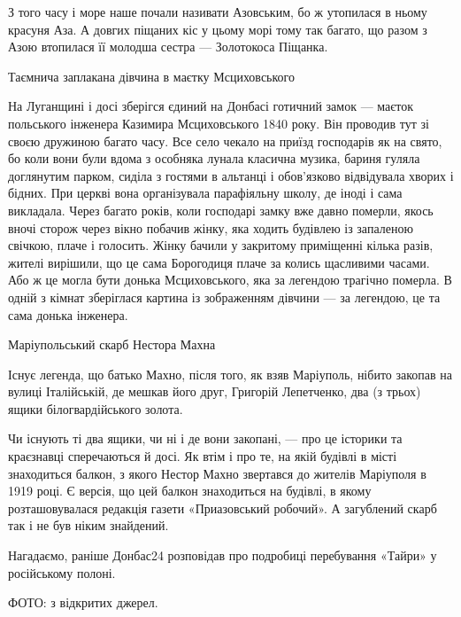 З того часу і море наше почали називати Азовським, бо ж утопилася в ньому
красуня Аза. А довгих піщаних кіс у цьому морі тому так багато, що разом з Азою
втопилася її молодша сестра — Золотокоса Піщанка.

Таємнича заплакана дівчина в маєтку Мсциховського

На Луганщині і досі зберігся єдиний на Донбасі готичний замок — маєток
польського інженера Казимира Мсциховського 1840 року. Він проводив тут зі своєю
дружиною багато часу. Все село чекало на приїзд господарів як на свято, бо коли
вони були вдома з особняка лунала класична музика, бариня гуляла доглянутим
парком, сиділа з гостями в альтанці і обов'язково відвідувала хворих і бідних.
При церкві вона організувала парафіяльну школу, де іноді і сама викладала.
Через багато років, коли господарі замку вже давно померли, якось вночі сторож
через вікно побачив жінку, яка ходить будівлею із запаленою свічкою, плаче і
голосить. Жінку бачили у закритому приміщенні кілька разів, жителі вирішили, що
це сама Борогодиця плаче за колись щасливими часами. Або ж це могла бути донька
Мсциховського, яка за легендою трагічно померла. В одній з кімнат зберіглася
картина із зображенням дівчини — за легендою, це та сама донька інженера.

Маріупольський скарб Нестора Махна

Існує легенда, що батько Махно, після того, як взяв Маріуполь, нібито закопав
на вулиці Італійській, де мешкав його друг, Григорій Лепетченко, два (з трьох)
ящики білогвардійського золота.

Чи існують ті два ящики, чи ні і де вони закопані, — про це історики та
краєзнавці сперечаються й досі. Як втім і про те, на якій будівлі в місті
знаходиться балкон, з якого Нестор Махно звертався до жителів Маріуполя в 1919
році. Є версія, що цей балкон знаходиться на будівлі, в якому розташовувалася
редакція газети «Приазовський робочий». А загублений скарб так і не був ніким
знайдений.

Нагадаємо, раніше Донбас24 розповідав про подробиці перебування «Тайри» у
російському полоні.

ФОТО: з відкритих джерел.
